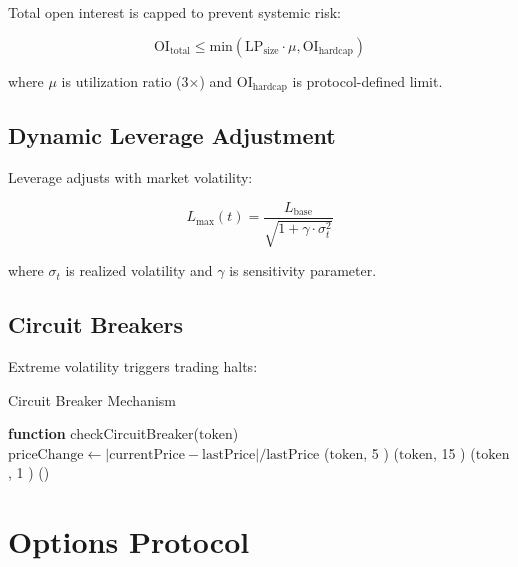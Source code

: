 \documentclass[11pt,a4paper]{article}
\begin{document}
Total open interest is capped to prevent systemic risk:

\begin{equation}
\text{OI}_{\text{total}} \leq \text{min}(\text{LP}_{\text{size}} \cdot \mu, \text{OI}_{\text{hardcap}})
\end{equation}

where $\mu$ is utilization ratio (3×) and $\text{OI}_{\text{hardcap}}$ is protocol-defined limit.

\subsection{Dynamic Leverage Adjustment}

Leverage adjusts with market volatility:

\begin{equation}
L_{\text{max}}(t) = \frac{L_{\text{base}}}{\sqrt{1 + \gamma \cdot \sigma_t^2}}
\end{equation}

where $\sigma_t$ is realized volatility and $\gamma$ is sensitivity parameter.

\subsection{Circuit Breakers}

Extreme volatility triggers trading halts:

\begin{algorithm}
\caption{Circuit Breaker Mechanism}
\begin{algorithmic}[1]
\STATE \textbf{function} checkCircuitBreaker($\text{token}$)
\STATE $\text{priceChange} \gets |\text{currentPrice} - \text{lastPrice}| / \text{lastPrice}$
    \STATE {}($\text{token}$, 5 )
    \STATE {}($\text{token}$, 15 )
    \STATE {}($\text{token}$, 1 )
\ENDIF
\STATE {}()
\end{algorithmic}
\end{algorithm}

\section{Options Protocol}
\end{document}

